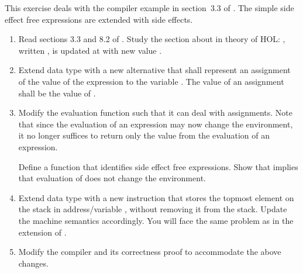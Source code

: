 %
\begin{isabellebody}%
\def\isabellecontext{a{\isadigit{3}}}%
\isamarkupfalse%
%
\isamarkuptrue%
%
\begin{isamarkuptext}%
This exercise deals with the compiler example in section~3.3
of \cite{isabelle-tutorial}. The simple side effect free expressions
are extended with side effects.
\begin{enumerate}

\item Read sections 3.3 and 8.2 of \cite{isabelle-tutorial}.  Study
the section about  in theory  of HOL:
, written , is 
updated at  with new value .

\item Extend data type  with a new alternative
 that shall represent an assignment  of the value of the expression  to the variable .
The value of an assignment shall be the value of .

\item Modify the evaluation function  such that it can
deal with assignments. Note that since the evaluation of an expression
may now change the environment, it no longer suffices to return only
the value from the evaluation of an expression.

Define a function  that
identifies side effect free expressions. Show that 
implies that evaluation of  does not change the environment.

\item Extend data type  with a new instruction
 that stores the topmost element on the stack in
address/variable , without removing it from the stack.
Update the machine semantics  accordingly. You will face
the same problem as in the extension of .

\item Modify the compiler  and its correctness proof to
accommodate the above changes.
\end{enumerate}%
\end{isamarkuptext}%
\isamarkuptrue%
\isamarkupfalse%
\end{isabellebody}%
